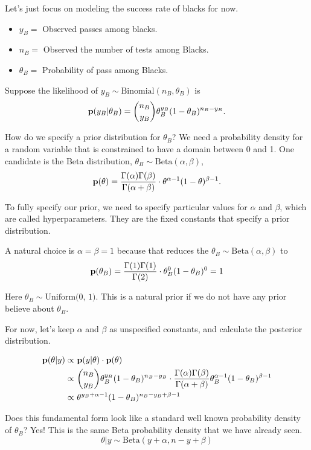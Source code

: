 Let's just focus on modeling the success rate of blacks for now.
\begin{itemize}
    \item $y_B=$ Observed passes among blacks.
    \item $n_B=$ Observed the number of  tests among Blacks.
    \item $\theta_B=$ Probability of pass among Blacks.
\end{itemize}

Suppose the likelihood of  $y_B \sim \text{Binomial}(n_B, \theta_B)$ is
\[
{\mathbf p}(y_B| \theta_B) = \binom{n_B}{y_B} \theta_B^{y_B} (1-\theta_B)^{n_B - y_B}.
\]

How do we specify a prior distribution for $\theta_B$? We need a probability density for a random variable that is constrained to have a domain between 0 and 1. One candidate is the Beta distribution, $\theta_B \sim \text{Beta}(\alpha, \beta)$,
\[
    {\mathbf p}(\theta) = \frac{\Gamma(\alpha) \Gamma(\beta)}{\Gamma(\alpha + \beta)} \cdot \theta^{\alpha-1} (1 - \theta)^{\beta-1}.
\]

To fully specify our prior, we need to specify particular values for $\alpha$ and $\beta$, which are called hyperparameters. They are the fixed constants that specify a prior distribution.

A natural choice is $\alpha = \beta = 1$ because that reduces the $\theta_B \sim \text{Beta}(\alpha, \beta)$ to 
\[
{\mathbf p}(\theta_B) = \frac{\Gamma(1)\Gamma(1)}{\Gamma(2)} \cdot \theta_{B}^0 (1 - \theta_B)^0 = 1
\]

Here $\theta_B \sim \text{Uniform(0, 1)}$. This is  a natural prior if we do not have any prior believe about $\theta_B$.

For now, let's keep $\alpha$ and $\beta$ as unspecified constants, and calculate the posterior distribution.

\begin{align*}
    {\mathbf p}(\theta|y) 
    \propto& ~{\mathbf p}(y| \theta) \cdot {\mathbf p}(\theta)\\
    \propto& ~\binom{n_B}{y_B}\theta_B^{y_B} (1-\theta_B)^{n_B-y_B} \cdot \frac{\Gamma(\alpha)\Gamma(\beta)}{\Gamma(\alpha+\beta)}\theta_B^{\alpha-1} (1 - \theta_B)^{\beta-1}\\
    \propto& ~\theta^{y_B+\alpha-1} (1-\theta_B)^{n_B-y_B+\beta-1}
\end{align*}

Does this fundamental form look like a standard well known probability density of $\theta_B$? Yes! This is the same Beta probability density that we have already seen.
\[
    \theta| y \sim \text{Beta}(y+\alpha, n-y+\beta)
\]

